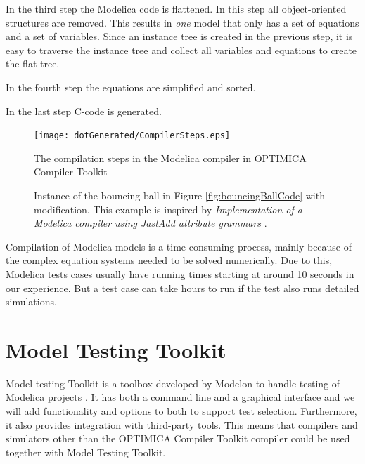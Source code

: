 \documentclass{cslthse-msc}
\begin{document}
In the third step the Modelica code is flattened. In this step all object-oriented structures are removed. This results in \emph{one} model that only has a set of equations and a set of variables. Since an instance tree is created in the previous step, it is easy to traverse the instance tree and collect all variables and equations to create the flat tree.

In the fourth step the equations are simplified and sorted.

In the last step C-code is generated. 

\begin{figure}[!htbp]
    \centering
    {\texttt{[image: dotGenerated/CompilerSteps.eps]}}
    \caption{The compilation steps in the Modelica compiler in OPTIMICA Compiler Toolkit }
    \label{fig:compilerSteps}
\end{figure}

\begin{figure}[!htbp]
    \centering
    
    \caption{Instance of the bouncing ball in Figure \ref{fig:bouncingBallCode} with modification. This example is inspired by \textit{Implementation of a Modelica compiler using JastAdd attribute grammars} \cite{aakesson2010implementation}.}
    \label{fig:bouncingBallInstance}
\end{figure}

Compilation of Modelica models is a time consuming process, mainly because of the complex equation systems needed to be solved numerically. Due to this, Modelica tests cases usually have running times starting at around 10 seconds in our experience. But a test case can take hours to run if the test also runs detailed simulations.

\section{Model Testing Toolkit}
Model testing Toolkit is a toolbox developed by Modelon to handle testing of Modelica projects \cite{modelon.comMTT}. It has both a command line and a graphical interface and we will add functionality and options to both to support test selection. Furthermore, it also provides integration with third-party tools. This means that compilers and simulators other than the OPTIMICA Compiler Toolkit  compiler could be used together with Model Testing Toolkit.
\end{document}
